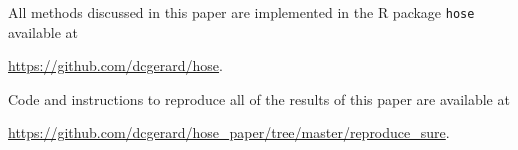 All methods discussed in this paper are implemented in the R package
\texttt{hose} available at
\begin{center}
  \href{https://github.com/dcgerard/hose}{https://github.com/dcgerard/hose}.
\end{center}
Code and instructions to reproduce all of the results of this paper are available at
\begin{center}
\href{https://github.com/dcgerard/hose\_paper/tree/master/reproduce\_sure}{https://github.com/dcgerard/hose\_paper/tree/master/reproduce\_sure}.
\end{center}